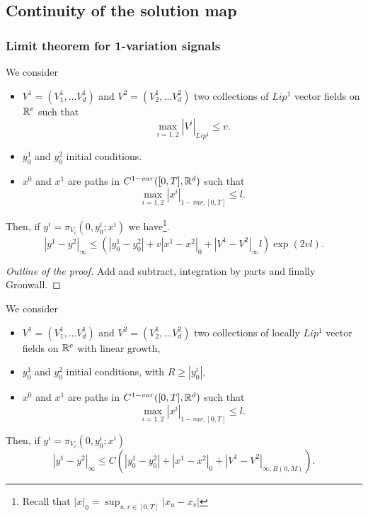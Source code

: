 \subsection{Continuity of the solution map}

\subsubsection{Limit theorem for 1-variation signals}

\begin{theorem}
    We consider
    \begin{itemize}
        \item $V^1 = (V_1^1, \ldots V^1_d)$ and $V^2 = (V_2^1, \ldots V^2_d)$ two collections of $Lip^1$ vector fields on $\mathbb{R}^e$ such that
        \begin{equation}
            \max_{i=1,2} |V^i|_{Lip^1} \leq v.
        \end{equation}
        \item $y_0^1$ and $y_0^2$ initial conditions.
        \item $x^0$ and $x^1$ are paths in $C^{1-var}([0,T], \mathbb{R}^d)$ such that 
        \begin{equation}
            \max_{i=1,2} |x^i|_{1-var, [0,T]} \leq l.
        \end{equation} 
    \end{itemize}
    Then, if $y^i = \pi_{V_i}(0, y_0^i; x^i)$ we have\footnote{Recall that $|x|_0 = \sup_{u,v \in [0,T]} |x_u - x_v|$}.
    \begin{equation}
        |y^1 - y^2|_\infty \leq \left( |y_0^1 - y_0^2| + v |x^1 - x^2|_0 + |V^1 - V^2|_\infty l \right) \exp(2vl).
    \end{equation}
\end{theorem}
\begin{proof}[Outline of the proof]
    Add and subtract, integration by parts and finally Gronwall.
\end{proof}

\begin{corollary}[Localization]
      We consider
    \begin{itemize}
        \item $V^1 = (V_1^1, \ldots V^1_d)$ and $V^2 = (V_2^1, \ldots V^2_d)$ two collections of locally $Lip^1$ vector fields on $\mathbb{R}^e$ with linear growth,
        \item $y_0^1$ and $y_0^2$ initial conditions, with $R \geq |y_0^i|,$
        \item $x^0$ and $x^1$ are paths in $C^{1-var}([0,T], \mathbb{R}^d)$ such that 
        \begin{equation}
            \max_{i=1,2} |x^i|_{1-var, [0,T]} \leq l.
        \end{equation} 
    \end{itemize}
    Then, if $y^i = \pi_{V_i}(0, y_0^i; x^i)$
     \begin{equation}
        |y^1 - y^2|_\infty \leq C \left( |y_0^1 - y_0^2| + |x^1 - x^2|_0 + |V^1 - V^2|_{\infty, B(0,M)} \right).
    \end{equation}
\end{corollary}

